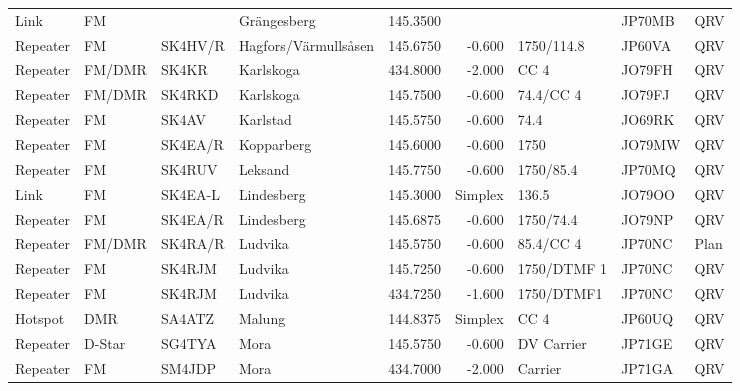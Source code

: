 \begin{landscape}
\begin{longtable}{llllrrlll}
	Link     & FM         &          & Grängesberg            &     145.3500 &            &                  & JP70MB      & QRV      \\
	Repeater & FM         & SK4HV/R  & Hagfors/Värmullsåsen   &     145.6750 &     -0.600 & 1750/114.8       & JP60VA      & QRV      \\
	Repeater & FM/DMR     & SK4KR    & Karlskoga              &     434.8000 &     -2.000 & CC 4             & JO79FH      & QRV      \\
	Repeater & FM/DMR     & SK4RKD   & Karlskoga              &     145.7500 &     -0.600 & 74.4/CC 4        & JO79FJ      & QRV      \\
	Repeater & FM         & SK4AV    & Karlstad               &     145.5750 &     -0.600 & 74.4             & JO69RK      & QRV      \\
	Repeater & FM         & SK4EA/R  & Kopparberg             &     145.6000 &     -0.600 & 1750             & JO79MW      & QRV      \\
	Repeater & FM         & SK4RUV   & Leksand                &     145.7750 &     -0.600 & 1750/85.4        & JP70MQ      & QRV      \\
	Link     & FM         & SK4EA-L  & Lindesberg             &     145.3000 &    Simplex & 136.5            & JO79OO      & QRV      \\
	Repeater & FM         & SK4EA/R  & Lindesberg             &     145.6875 &     -0.600 & 1750/74.4        & JO79NP      & QRV      \\
	Repeater & FM/DMR     & SK4RA/R  & Ludvika                &     145.5750 &     -0.600 & 85.4/CC 4        & JP70NC      & Plan     \\
	Repeater & FM         & SK4RJM   & Ludvika                &     145.7250 &     -0.600 & 1750/DTMF 1      & JP70NC      & QRV      \\
	Repeater & FM         & SK4RJM   & Ludvika                &     434.7250 &     -1.600 & 1750/DTMF1       & JP70NC      & QRV      \\
	Hotspot  & DMR        & SA4ATZ   & Malung                 &     144.8375 &    Simplex & CC 4             & JP60UQ      & QRV      \\
	Repeater & D-Star     & SG4TYA   & Mora                   &     145.5750 &     -0.600 & DV Carrier       & JP71GE      & QRV      \\
	Repeater & FM         & SM4JDP   & Mora                   &     434.7000 &     -2.000 & Carrier          & JP71GA      & QRV      \\

\end{longtable}
\end{landscape}
